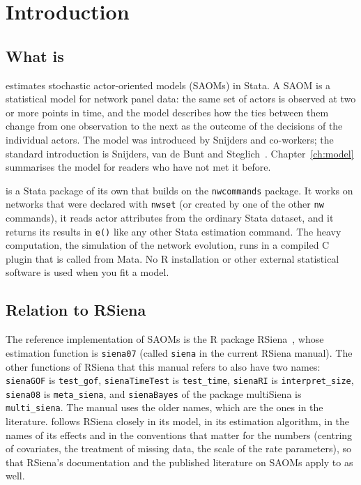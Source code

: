 \chapter{Introduction}\label{ch:intro}

\section{What \texorpdfstring{\nwsaom}{nwsaom} is}

\nwsaom{} estimates stochastic actor-oriented models (SAOMs) in Stata. A SAOM is a statistical model for network panel data: the same set of actors is observed at two or more points in time, and the model describes how the ties between them change from one observation to the next as the outcome of the decisions of the individual actors. The model was introduced by Snijders and co-workers; the standard introduction is Snijders, van de Bunt and Steglich~\cite{snijders2010}. Chapter~\ref{ch:model} summarises the model for readers who have not met it before.

\nwsaom{} is a Stata package of its own that builds on the \texttt{nwcommands} package. It works on networks that were declared with \texttt{nwset} (or created by one of the other \texttt{nw} commands), it reads actor attributes from the ordinary Stata dataset, and it returns its results in \texttt{e()} like any other Stata estimation command. The heavy computation, the simulation of the network evolution, runs in a compiled C plugin that is called from Mata. No R installation or other external statistical software is used when you fit a model.

\section{Relation to RSiena}

The reference implementation of SAOMs is the R package RSiena~\cite{ripley}, whose estimation function is \texttt{siena07} (called \texttt{siena} in the current RSiena manual). The other functions of RSiena that this manual refers to also have two names: \texttt{sienaGOF} is \texttt{test\_gof}, \texttt{sienaTimeTest} is \texttt{test\_time}, \texttt{sienaRI} is \texttt{interpret\_size}, \texttt{siena08} is \texttt{meta\_siena}, and \texttt{sienaBayes} of the package multiSiena is \texttt{multi\_siena}. The manual uses the older names, which are the ones in the literature. \nwsaom{} follows RSiena closely in its model, in its estimation algorithm, in the names of its effects and in the conventions that matter for the numbers (centring of covariates, the treatment of missing data, the scale of the rate parameters), so that RSiena's documentation and the published literature on SAOMs apply to \nwsaom{} as well.

